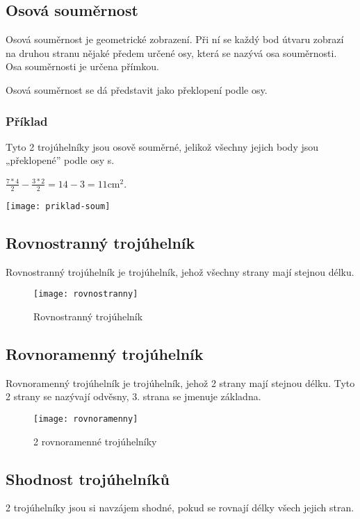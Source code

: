 \subsection{Osová souměrnost}

Osová souměrnost je geometrické zobrazení. Při ní se každý bod útvaru zobrazí na druhou stranu nějaké předem určené osy, která se nazývá osa souměrnosti. Osa souměrnosti je určena přímkou.

Osová souměrnost se dá představit jako překlopení podle osy.

\subsubsection{Příklad}
\begin{minipage}[t]{\linewidth}
    Tyto 2 trojúhelníky jsou osově souměrné, jelikož všechny jejich body jsou „překlopené” podle osy s.

    $ \frac{7*4}{2} - \frac{3*2}{2} =  14 - 3 = 11 \text{cm}^{2}$.
    \begin{center}
        \texttt{[image: priklad-soum]}
    \end{center}
\end{minipage}

\subsection{Rovnostranný trojúhelník}
Rovnostranný trojúhelník je trojúhelník, jehož všechny strany mají stejnou délku.

\begin{figure}[h]
    \caption{Rovnostranný trojúhelník}
    \centering
    \texttt{[image: rovnostranny]}
\end{figure}

\subsection{Rovnoramenný trojúhelník}
Rovnoramenný trojúhelník je trojúhelník, jehož 2 strany mají stejnou délku. Tyto 2 strany se nazývají odvěsny, 3. strana se jmenuje základna.

\begin{figure}[h]
    \caption{2 rovnoramenné trojúhelníky}
    \centering
    \texttt{[image: rovnoramenny]}
\end{figure}

\subsection{Shodnost trojúhelníků}
2 trojúhelníky jsou si navzájem shodné, pokud se rovnají délky všech jejich stran.


